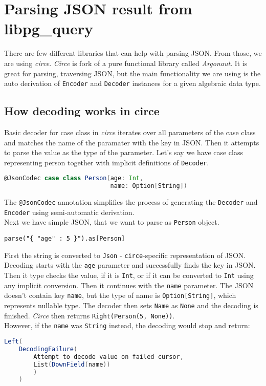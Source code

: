 \section{Parsing JSON result from libpg\_query}
There are few different libraries that can help with parsing JSON. From those, we are using \textit{circe}. \textit{Circe} is fork of a pure functional library called \textit{Argonaut}. It is great for parsing, traversing JSON, but the main functionality we are using is the auto derivation of \texttt{Encoder} and \texttt{Decoder} instances for a given algebraic data type. 

\subsection{How decoding works in circe}
Basic decoder for case class in \textit{circe} iterates over all parameters of the case class and matches the name of the paramater with the key in JSON. Then it attempts to parse the value as the type of the parameter. Let's say we have case class representing person together with implicit definitions of \texttt{Decoder}.
\begin{lstlisting}[language=scala, basicstyle=\ttfamily, showstringspaces=false, caption={Scala case class with \texttt{@JsonCodec} annotation}]
@JsonCodec case class Person(age: Int, 
                             name: Option[String])
\end{lstlisting}
The \texttt{@JsonCodec} annotation simplifies the process of generating the \texttt{Decoder} and \texttt{Encoder} using semi-automatic derivation. \cite{Semi automatic derivation} \\
Next we have simple JSON, that we want to parse as \texttt{Person} object.
\begin{lstlisting}[basicstyle=\ttfamily, showstringspaces=false, caption={Deparsing JSON using \textit{circe}}]
parse("{ "age" : 5 }").as[Person]
\end{lstlisting}
First the string is converted to \texttt{Json} - \texttt{circe}-specific representation of JSON. Decoding starts with the \texttt{age} parameter and successfully finds the key in JSON. Then it type checks the value, if it is \texttt{Int}, or if it can be converted to \texttt{Int} using any implicit conversion. Then it continues with the \texttt{name} parameter. The JSON doesn't contain key \texttt{name}, but the type of name is \texttt{Option[String]}, which represents nullable type. The decoder then sets \texttt{Name} as \texttt{None} and the decoding is finished. \textit{Circe} then returns \texttt{Right(Person(5, None))}. \\
However, if the \texttt{name} was \texttt{String} instead, the decoding would stop and return: 
\begin{lstlisting}[language=scala, basicstyle=\ttfamily, showstringspaces=false, caption={Return value on decoding failure}]
Left(
    DecodingFailure(
        Attempt to decode value on failed cursor,
        List(DownField(name))
        )
    )
\end{lstlisting}

